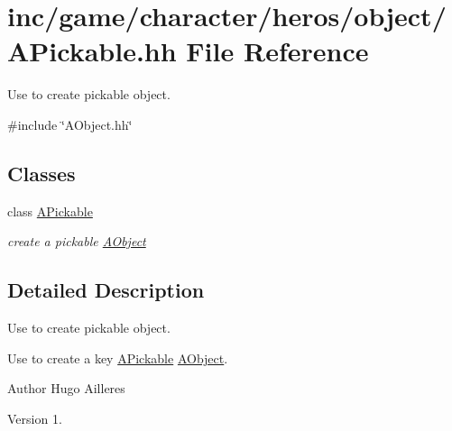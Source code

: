\hypertarget{APickable_8hh}{}\section{inc/game/character/heros/object/\+A\+Pickable.hh File Reference}
\label{APickable_8hh}


Use to create pickable object.  


{\ttfamily \#include \char`\"{}A\+Object.\+hh\char`\"{}}\newline
\subsection*{Classes}
\begin{DoxyCompactItemize}
\item 
class \hyperlink{classAPickable}{A\+Pickable}
\begin{DoxyCompactList}\small\item\em create a pickable \hyperlink{classAObject}{A\+Object} \end{DoxyCompactList}\end{DoxyCompactItemize}


\subsection{Detailed Description}
Use to create pickable object. 

Use to create a key \hyperlink{classAPickable}{A\+Pickable} \hyperlink{classAObject}{A\+Object}.

\begin{DoxyAuthor}{Author}
Hugo Ailleres 
\end{DoxyAuthor}
\begin{DoxyVersion}{Version}
1. 
\end{DoxyVersion}
